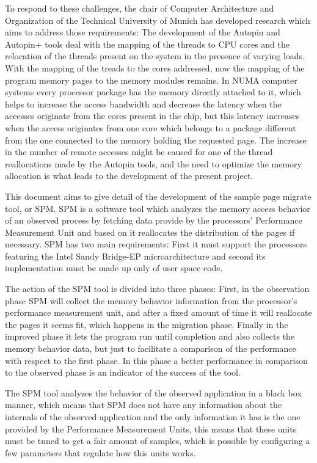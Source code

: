 To respond to these challenges, the chair of Computer Architecture and Organization of the Technical University of Munich has developed research which aims to address those requirements: The development of the Autopin and Autopin+ tools deal with the mapping of the threads to CPU cores and the relocation of the threads present on the system in the presence of varying loads. 
With the mapping of the treads to the cores addressed, now the mapping of the program memory pages to the memory modules remains. In NUMA computer systems every processor package has the memory directly attached to it, which helps to increase the access bandwidth and decrease the latency when the accesses originate from the cores present in the chip, but this latency increases when the access originates from one core which belongs to a package different from the one connected to the memory holding the requested page.  The increase in the number of remote accesses might be caused for one of the thread reallocations made by the Autopin tools, and the need to optimize the memory allocation is what leads to the development of the present project.

This document aims to give detail of the development of the sample page migrate tool, or SPM. SPM is a software tool which analyzes the memory access behavior of an observed process by fetching data provide by the processors’ Performance Measurement Unit and based on it reallocates the distribution of the pages if necessary. SPM has two main requirements: First it must support the processors featuring the Intel Sandy Bridge-EP microarchitecture and second its implementation must be made up only of user space code.

The action of the SPM tool is divided into three phases: First, in the observation phase SPM will collect the memory behavior information from the processor’s performance measurement unit, and after a fixed amount of time it will reallocate the pages it seems fit, which happens in the migration phase. Finally in the improved phase it lets the program run until completion and also collects the memory behavior data, but just to facilitate a comparison of the performance with respect to the first phase. In this phase a better performance in comparison to the observed phase is an indicator of the success of the tool.

The SPM tool analyzes the behavior of the observed application in a black box manner, which means that SPM does not have any information about the internals of the observed application and the only information it has is the one provided by the Performance Measurement Units, this means that these units must be tuned to get a fair amount of samples, which is possible by configuring a few parameters that regulate how this units works.

